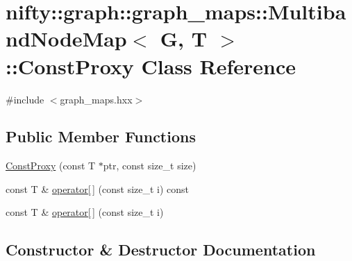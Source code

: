\hypertarget{classnifty_1_1graph_1_1graph__maps_1_1MultibandNodeMap_1_1ConstProxy}{}\section{nifty\+:\+:graph\+:\+:graph\+\_\+maps\+:\+:Multiband\+Node\+Map$<$ G, T $>$\+:\+:Const\+Proxy Class Reference}
\label{classnifty_1_1graph_1_1graph__maps_1_1MultibandNodeMap_1_1ConstProxy}


{\ttfamily \#include $<$graph\+\_\+maps.\+hxx$>$}

\subsection*{Public Member Functions}
\begin{DoxyCompactItemize}
\item 
\hyperlink{classnifty_1_1graph_1_1graph__maps_1_1MultibandNodeMap_1_1ConstProxy_aeac8849b72e282139c7295338a01c03d}{Const\+Proxy} (const T $\ast$ptr, const size\+\_\+t size)
\item 
const T \& \hyperlink{classnifty_1_1graph_1_1graph__maps_1_1MultibandNodeMap_1_1ConstProxy_a9ebcfe23f6ddb66c8f0f804094464b4b}{operator\mbox{[}$\,$\mbox{]}} (const size\+\_\+t i) const 
\item 
const T \& \hyperlink{classnifty_1_1graph_1_1graph__maps_1_1MultibandNodeMap_1_1ConstProxy_ae5d15b412656d2505a13a6f6209adee9}{operator\mbox{[}$\,$\mbox{]}} (const size\+\_\+t i)
\end{DoxyCompactItemize}


\subsection{Constructor \& Destructor Documentation}
\hypertarget{classnifty_1_1graph_1_1graph__maps_1_1MultibandNodeMap_1_1ConstProxy_aeac8849b72e282139c7295338a01c03d}{}
